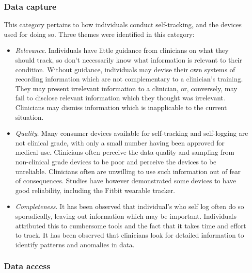 \documentclass{sigchi}
\begin{document}
\subsubsection{Data capture}

This category pertains to how individuals conduct self-tracking, and the devices used for doing so. Three themes were identified in this category:

\begin{itemize}
    \item \textit{Relevance}. Individuals have little guidance from clinicians on what they should track, so don't necessarily know what information is relevant to their condition. Without guidance, individuals may devise their own systems of recording information which are not complementary to a clinician's training. They may present irrelevant information to a clinician, or, conversely, may fail to disclose relevant information which they thought was irrelevant. Clinicians may dismiss information which is inapplicable to the current situation.
    
    \item \textit{Quality}. Many consumer devices available for self-tracking and self-logging are not clinical grade, with only a small number having been approved for medical use. Clinicians often perceive the data quality and sampling from non-clinical grade devices to be poor and perceive the devices to be unreliable. Clinicians often are unwilling to use such information out of fear of consequences. Studies have however demonstrated some devices to have good reliability, including the Fitbit wearable tracker.
    
    \item \textit{Completeness}. It has been observed that individual's who self log often do so sporadically, leaving out information which may be important. Individuals attributed this to cumbersome tools and the fact that it takes time and effort to track. It has been observed that clinicians look for detailed information to identify patterns and anomalies in data.
\end{itemize}

\subsubsection{Data access}
\end{document}
